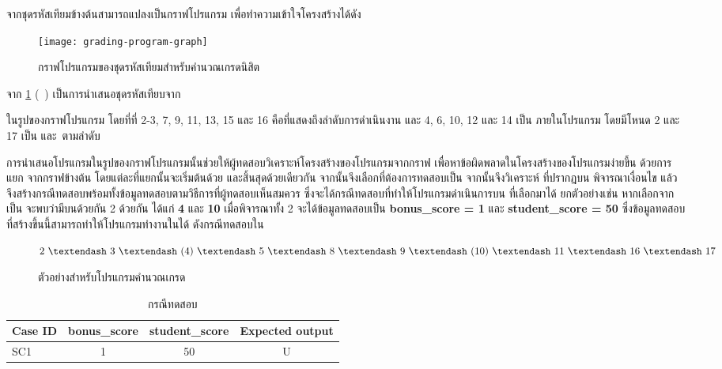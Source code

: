 จากชุดรหัสเทียมข้างต้นสามารถแปลงเป็นกราฟโปรแกรม เพื่อทำความเข้าใจโครงสร้างได้ดัง{ 

\begin{figure}[hbt!]
    \centering
    \texttt{[image: grading-program-graph]}
    \caption{กราฟโปรแกรมของชุดรหัสเทียมสำหรับคำนวณเกรดนิสิต}
    \label{fig:programGraph}
\end{figure}

จาก{\figurename} \ref{fig:programGraph} (\pagename\ \pageref{fig:programGraph}) เป็นการนำเสนอชุดรหัสเทียบจาก
{ ในรูปของกราฟโปรแกรม โดยที่{\Node}ที่ 2-3, 7, 9, 11, 13, 15 และ 16 
คือ{\Node}ที่แสดงถึงลำดับการดำเนินงาน และ{\Node} 4, 6, 10, 12 และ 14 
เป็น{\FirstTimeDefine{\PredicateNode}{\PredicateNodeEN}} ภายในโปรแกรม โดยมีโหนด 2 และ 17 
เป็น{\FirstTimeDefine{\sourcenode}{\sourcenodeEN}} และ{\FirstTimeDefine{\sinknode}{\sinknodeEN}}\ ตามลำดับ 

การนำเสนอโปรแกรมในรูปของกราฟโปรแกรมนั้นช่วยให้ผู้ทดสอบวิเคราะห์โครงสร้างของโปรแกรมจากกราฟ 
เพื่อหาข้อผิดพลาดในโครงสร้างของโปรแกรมง่ายขึ้น ด้วยการแยก{\FirstTimeDefine{\BasisPath}{\BasisPathEN}} 
จากกราฟข้างต้น โดยแต่ละ{\BasisPath}ที่แยกนั้นจะเริ่มต้นด้วย{\sourcenode} และสิ้นสุดด้วย{\sinknode}เดียวกัน 
จากนั้นจึงเลือก{\BasisPath}ที่ต้องการทดสอบเป็น \FirstTimeDefine{\TestPath}{\TestPathEN} จากนั้นจึงวิเคราะห์{\PredicateNode}
ที่ปรากฎบน{\TestPath} พิจารณาเงื่อนไข แล้วจึงสร้างกรณีทดสอบพร้อมทั้งข้อมูลทดสอบตามวิธีการที่ผู้ทดสอบเห็นสมควร 
ซึ่งจะได้กรณีทดสอบที่ทำให้โปรแกรมดำเนินการบน{\TestPath} ที่เลือกมาได้ ยกตัวอย่างเช่น 
หากเลือก{\BasisPath}จาก{} เป็น{\TestPath} จะพบว่ามี{\PredicateNode}บน{\TestPath}ด้วยกัน 2 {\Node} 
ด้วยกัน ได้แก่ {\bf 4} และ {\bf 10} เมื่อพิจารณา{\PredicateNode}ทั้ง 2 จะได้ข้อมูลทดสอบเป็น {\bf bonus\_score = 1} และ 
{\bf student\_score = 50} ซึ่งข้อมูลทดสอบที่สร้างขึ้นนี้สามารถทำให้โปรแกรมทำงานใน{\TestPath}ได้ 
ดังกรณีทดสอบใน

\begin{figure}[ht!]
    \centering
    \small{$2\ \textendash\ 3\ \textendash\ 
                (4)\ \textendash\ 5\ \textendash\ 8\ \textendash\ 9\ \textendash\ 
                (10)\ \textendash\ 11\ \textendash\ 16\ \textendash\ 17$}
    \caption{ตัวอย่าง{\TestPath}สำหรับโปรแกรมคำนวณเกรด}
    \label{fig:testpath}
\end{figure}


\begin{table}[ht!]
    \centering
    \caption{กรณีทดสอบ}
    \label{tab:simpleTestCase}
    \begin{tabular}{|l|c|c|c|}
    \hline
    \rowcolor{LightGray}
    Case ID     & bonus\_score  & student\_score    & Expected output \\
    \hline
    SC1         & 1             & 50                & U \\
    \hline
    \end{tabular}
\end{table}

}}
